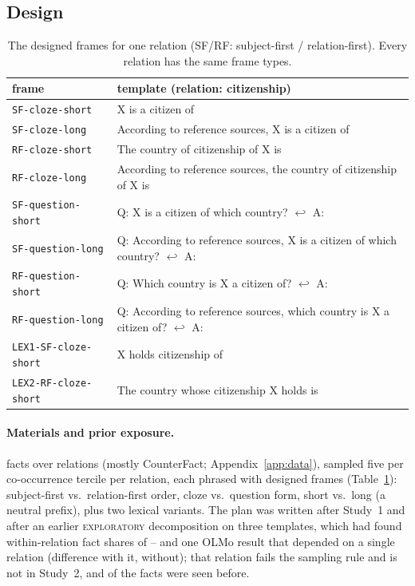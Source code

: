 \documentclass[11pt]{article}
\newcommand{\expl}{\textsc{exploratory}\xspace}
\newcommand{\SOne}{Study~1\xspace} %
\newcommand{\STwo}{Study~2\xspace} %
\begin{document}
\subsection{Design}
\begin{table}[t]
\centering\footnotesize\setlength{\tabcolsep}{3pt} %
\begin{tabular}{@{}ll@{}}
\toprule
frame & template (relation: citizenship) \\
\midrule
\texttt{SF-cloze-short} & X is a citizen of \\
\texttt{SF-cloze-long} & According to reference sources, X is a citizen of \\
\texttt{RF-cloze-short} & The country of citizenship of X is \\
\texttt{RF-cloze-long} & According to reference sources, the country of citizenship of X is \\
\texttt{SF-question-short} & Q: X is a citizen of which country? $\hookleftarrow$ A: \\
\texttt{SF-question-long} & Q: According to reference sources, X is a citizen of which country? $\hookleftarrow$ A: \\
\texttt{RF-question-short} & Q: Which country is X a citizen of? $\hookleftarrow$ A: \\
\texttt{RF-question-long} & Q: According to reference sources, which country is X a citizen of? $\hookleftarrow$ A: \\
\texttt{LEX1-SF-cloze-short} & X holds citizenship of \\
\texttt{LEX2-RF-cloze-short} & The country whose citizenship X holds is \\
\bottomrule
\end{tabular}
\caption{The designed frames for one relation (SF/RF: subject-first / relation-first). Every relation has the same frame types.}
\label{tab:frames}
\end{table}
\paragraph{Materials and prior exposure.}
\ptNFacts{} facts over \ptNRelations{} relations (mostly CounterFact; Appendix~\ref{app:data}), sampled five per co-occurrence tercile per relation, each phrased with \ptNFrames{} designed frames (Table~\ref{tab:frames}): subject-first vs.\ relation-first order, cloze vs.\ question form, short vs.\ long (a neutral prefix), plus two lexical variants.
The plan was written after \SOne and after an earlier \expl decomposition on three templates, which had found within-relation fact shares of \ptPriorIccLo--\ptPriorIccHi{} and one OLMo result that depended on a single relation (difference \ptPriorCeoBefore{} with it, \ptPriorCeoAfter{} without); that relation fails the sampling rule and is not in \STwo, and \ptPriorOverlap{} of the \ptNFacts{} facts were seen before.
\end{document}
